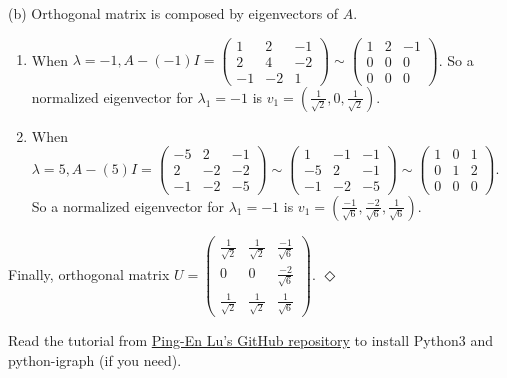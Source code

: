 \documentclass[12pt]{article}
\newcommand{\esolution}{\hfill $\Diamond$ \\ \vspace{.3cm}}
\begin{document}
(b) Orthogonal matrix is composed by eigenvectors of $A$.
\begin{enumerate}
	\item When $\lambda=-1, A-(-1)I=
	\begin{pmatrix}
		1 & 2 & -1 \\
		2 & 4 & -2 \\
		-1 & -2 & 1
	\end{pmatrix}\sim
	\begin{pmatrix}
		1 & 2 & -1 \\
		0 & 0 & 0 \\
		0 & 0 & 0
	\end{pmatrix}$. So a normalized eigenvector for $\lambda _1=-1$ is 
	$v_1=(\frac{1}{\sqrt{2}}, 0, \frac{1}{\sqrt{2}})$.
	\item When $\lambda=5, A-(5)I=
	\begin{pmatrix}
		-5 & 2 & -1 \\
		2 & -2 & -2 \\
		-1 & -2 & -5
	\end{pmatrix}\sim
	\begin{pmatrix}
		1 & -1 & -1 \\
		-5 & 2 & -1 \\
		-1 & -2 & -5
	\end{pmatrix}\sim
	\begin{pmatrix}
		1 & 0 & 1 \\
		0 & 1 & 2 \\
		0 & 0 & 0
	\end{pmatrix}$. So a normalized eigenvector for $\lambda _1=-1$ is 
	$v_1=(\frac{-1}{\sqrt{6}}, \frac{-2}{\sqrt{6}}, \frac{1}{\sqrt{6}})$.
\end{enumerate}
\qquad\quad Finally, orthogonal matrix $U=
	\begin{pmatrix}
		\frac{1}{\sqrt{2}} & \frac{1}{\sqrt{2}} & \frac{-1}{\sqrt{6}} \\[0.4em]
		0 & 0 & \frac{-2}{\sqrt{6}} \\[0.4em]
		\frac{1}{\sqrt{2}} & \frac{1}{\sqrt{2}} & \frac{1}{\sqrt{6}}
	\end{pmatrix}$.
\esolution

Read the tutorial from \href{https://github.com/PingEnLu/Network-Science-COM530500/tree/master/Network_Science_Python_iGraph_Tutorial}{Ping-En Lu's GitHub repository} to install Python3 and python-igraph (if you need).
\end{document}
